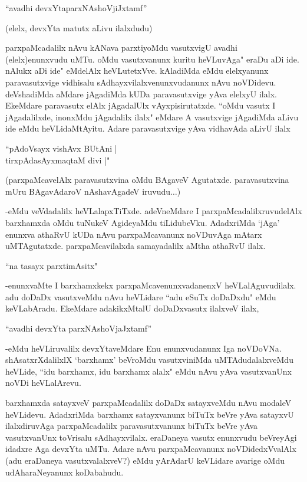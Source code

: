 \begin{shloka}
``avadhi devxYtaparxNAshoVjiJxtamf''
\end{shloka}

(elelx, devxYta matutx aLivu ilalxdudu)

parxpaMcadalilx nAvu kANava parxtiyoMdu vasutxvigU avadhi (elelx)enunxvudu uMTu. oMdu vasutxvanunx kuritu heVLuvAga" eraDu aDi ide. nAlukx aDi ide" eMdelAlx heVLutetxVve. kAladiMda eMdu elelxyanunx paravasutxvige vidhisalu sAdhayxvilalxvenunxvudanunx nAvu noVDidevu. deVshadiMda aMdare jAgadiMda kUDa paravasutxvige yAva elelxyU ilalx. EkeMdare paravasutx elAlx jAgadalUlx vAyxpisirutatxde. ``oMdu vasutx I jAgadalilxde, inonxMdu jAgadalilx ilalx" eMdare A vasutxvige jAgadiMda aLivu ide eMdu heVLidaMtAyitu. Adare paravasutxvige yAva vidhavAda aLivU ilalx 

\begin{shloka}
``pAdoV\s sayx vishAvx BUtAni |\\
tirxpAdasAyxmaqtaM divi |"
\end{shloka}
 
 (parxpaMcavelAlx paravasutxvina oMdu BAgaveV Agutatxde. paravasutxvina mUru BAgavAdaroV nAshavAgadeV iruvudu$\ldots$)
 
 
 -eMdu veVdadalilx heVLalapxTiTxde. adeVneMdare I parxpaMcadalilxruvudelAlx barxhamxda oMdu tuNukeV AgideyaMdu tiLidubeVku. AdadxriMda `jAga' enunxva athaRvU kUDa nAvu parxpaMcavanunx noVDuvAga mAtarx uMTAgutatxde. parxpaMcavilalxda samayadalilx aMtha athaRvU ilalx.
 
 
 \begin{shloka}
 ``na tasayx parxtimA\s sitx"
\end{shloka} 

-enunxvaMte I barxhamxkekx parxpaMcavenunxvadanenxV heVLalAguvudilalx. adu doDaDx vasutxveMdu nAvu heVLidare ``adu eSuTx doDaDxdu" eMdu keVLabAradu. EkeMdare adakikxMtalU doDaDxvasutx ilalxveV ilalx, 

\begin{shloka}
``avadhi devxYta parxNAshoVjaJxtamf''
\end{shloka}

-eMdu heVLiruvalilx devxYtaveMdare Enu enunxvudanunx Iga noVDoVNa. shAsatxrXdalilxlX `barxhamx' beVroMdu vasutxviniMda uMTAdudalalxveMdu heVLide, ``idu barxhamx, idu barxhamx alalx" eMdu nAvu yAva vasutxvanUnx noVDi heVLalArevu. 


barxhamxda satayxveV parxpaMcadalilx doDaDx satayxveMdu nAvu modaleV heVLidevu. AdadxriMda barxhamx satayxvanunx biTuTx beVre yAva satayxvU ilalxdiruvAga parxpaMcadalilx paravasutxvanunx biTuTx beVre yAva vasutxvanUnx toVrisalu sAdhayxvilalx. eraDaneya vasutx enunxvudu beVreyAgi idadxre Aga devxYta uMTu. Adare nAvu parxpaMcavanunx noVDidedxVvalAlx (adu eraDaneya vasutxvalalxveV?) eMdu yArAdarU keVLidare avarige oMdu udAharaNeyanunx koDabahudu. 

